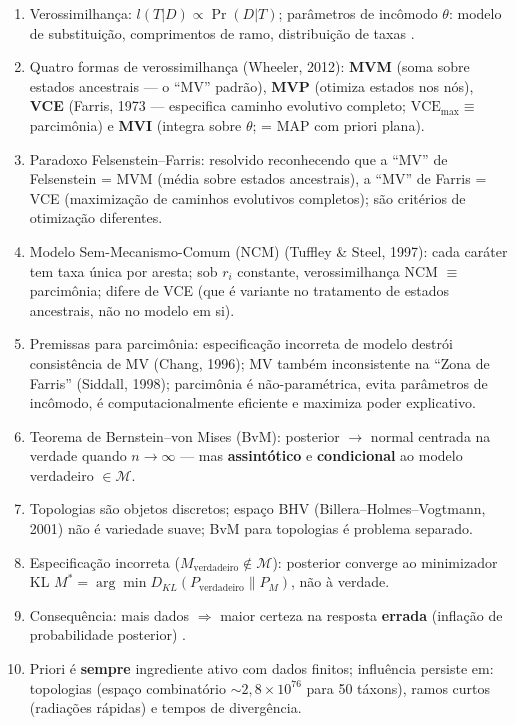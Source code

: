 \clearpage
\begin{revise}\small
\begin{enumerate}[itemsep=0pt, topsep=0pt, parsep=0pt]
    \item Verossimilhança: $l(T|D) \propto \Pr(D|T)$; parâmetros de incômodo $\theta$: modelo de substituição, comprimentos de ramo, distribuição de taxas \parencite{edwards1972,wheeler2012}.
    \item Quatro formas de verossimilhança (Wheeler, 2012): \textbf{MVM} (soma sobre estados ancestrais --- o ``MV'' padrão), \textbf{MVP} (otimiza estados nos nós), \textbf{VCE} (Farris, 1973 --- especifica caminho evolutivo completo; $\text{VCE}_{\max} \equiv$ parcimônia) e \textbf{MVI} (integra sobre $\theta$; = MAP com priori plana).
    \item Paradoxo Felsenstein--Farris: resolvido reconhecendo que a ``MV'' de Felsenstein = MVM (média sobre estados ancestrais), a ``MV'' de Farris = VCE (maximização de caminhos evolutivos completos); são critérios de otimização diferentes.
    \item Modelo Sem-Mecanismo-Comum (NCM) (Tuffley \& Steel, 1997): cada caráter tem taxa única por aresta; sob $r_i$ constante, verossimilhança NCM $\equiv$ parcimônia; difere de VCE (que é variante no tratamento de estados ancestrais, não no modelo em si).
    \item Premissas para parcimônia: especificação incorreta de modelo destrói consistência de MV (Chang, 1996); MV também inconsistente na ``Zona de Farris'' (Siddall, 1998); parcimônia é não-paramétrica, evita parâmetros de incômodo, é computacionalmente eficiente e maximiza poder explicativo.
    \item Teorema de Bernstein--von Mises (BvM): posterior $\to$ normal centrada na verdade quando $n\to\infty$ --- mas \textbf{assintótico} e \textbf{condicional} ao modelo verdadeiro $\in \mathcal{M}$.
    \item Topologias são objetos discretos; espaço BHV (Billera--Holmes--Vogtmann, 2001) não é variedade suave; BvM para topologias é problema separado.
    \item Especificação incorreta ($M_{\text{verdadeiro}} \notin \mathcal{M}$): posterior converge ao minimizador KL $M^* = \arg\min D_{KL}(P_{\text{verdadeiro}} \| P_M)$, não à verdade.
    \item Consequência: mais dados $\Rightarrow$ maior certeza na resposta \textbf{errada} (inflação de probabilidade posterior) \parencite{suzuki2002,kumar2012}.
    \item Priori é \textbf{sempre} ingrediente ativo com dados finitos; influência persiste em: topologias (espaço combinatório $\sim 2{,}8\times 10^{76}$ para 50 táxons), ramos curtos (radiações rápidas) e tempos de divergência.

\end{enumerate}
\end{revise}

